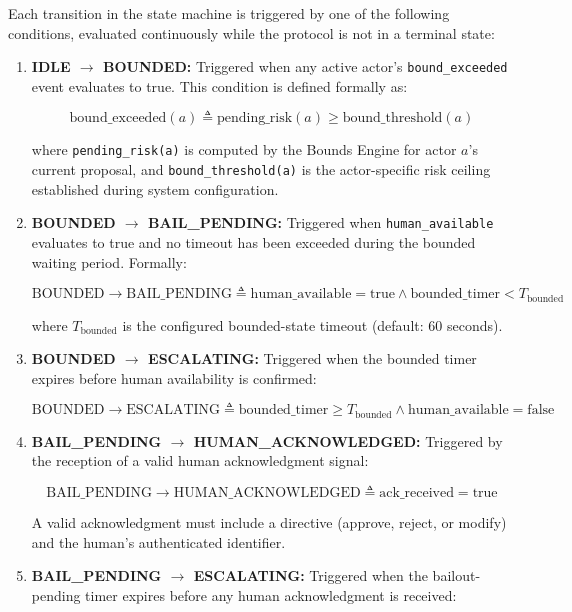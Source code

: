 Each transition in the state machine is triggered by one of the following conditions, evaluated continuously while the protocol is not in a terminal state:

\begin{enumerate}

\item \textbf{IDLE $\rightarrow$ BOUNDED:} Triggered when any active actor's \texttt{bound\_exceeded} event evaluates to true. This condition is defined formally as:

\[
\text{bound\_exceeded}(a) \triangleq \text{pending\_risk}(a) \geq \text{bound\_threshold}(a)
\]

where \texttt{pending\_risk(a)} is computed by the Bounds Engine for actor $a$'s current proposal, and \texttt{bound\_threshold(a)} is the actor-specific risk ceiling established during system configuration.

\item \textbf{BOUNDED $\rightarrow$ BAIL\_PENDING:} Triggered when \texttt{human\_available} evaluates to true and no timeout has been exceeded during the bounded waiting period. Formally:

\[
\text{BOUNDED} \rightarrow \text{BAIL\_PENDING} \triangleq \text{human\_available} = \text{true} \land \text{bounded\_timer} < T_{\text{bounded}}
\]

where $T_{\text{bounded}}$ is the configured bounded-state timeout (default: 60 seconds).

\item \textbf{BOUNDED $\rightarrow$ ESCALATING:} Triggered when the bounded timer expires before human availability is confirmed:

\[
\text{BOUNDED} \rightarrow \text{ESCALATING} \triangleq \text{bounded\_timer} \geq T_{\text{bounded}} \land \text{human\_available} = \text{false}
\]

\item \textbf{BAIL\_PENDING $\rightarrow$ HUMAN\_ACKNOWLEDGED:} Triggered by the reception of a valid human acknowledgment signal:

\[
\text{BAIL\_PENDING} \rightarrow \text{HUMAN\_ACKNOWLEDGED} \triangleq \text{ack\_received} = \text{true}
\]

A valid acknowledgment must include a directive (approve, reject, or modify) and the human's authenticated identifier.

\item \textbf{BAIL\_PENDING $\rightarrow$ ESCALATING:} Triggered when the bailout-pending timer expires before any human acknowledgment is received:


\end{enumerate}
